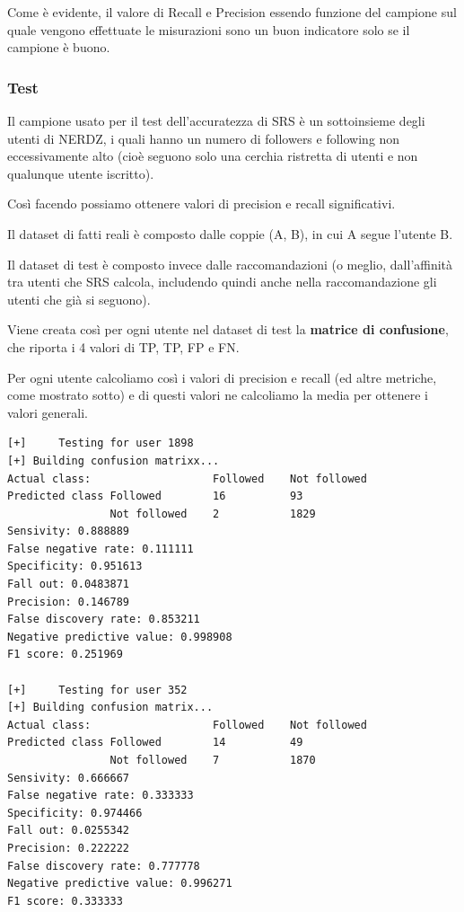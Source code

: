 {Come è evidente, il valore di Recall e Precision essendo funzione del campione sul quale vengono effettuate le misurazioni sono un buon indicatore solo se il campione è buono.

\subsubsection{Test}
Il campione usato per il test dell'accuratezza di SRS è un sottoinsieme degli utenti di NERDZ, i quali hanno un numero di followers e following non eccessivamente alto (cioè seguono solo una cerchia ristretta di utenti e non qualunque utente iscritto).

Così facendo possiamo ottenere valori di precision e recall significativi.

Il dataset di fatti reali è composto dalle coppie (A, B), in cui A segue l'utente B.

Il dataset di test è composto invece dalle raccomandazioni (o meglio, dall'affinità tra utenti che SRS calcola, includendo quindi anche nella raccomandazione gli utenti che già si seguono).

Viene creata così per ogni utente nel dataset di test la \textbf{matrice di confusione}, che riporta i 4 valori di TP, TP, FP e FN.

Per ogni utente calcoliamo così i valori di precision e recall (ed altre metriche, come mostrato sotto) e di questi valori ne calcoliamo la media per ottenere i valori generali.
\begin{lstlisting}[language=xml, caption=Alcuni risultati dai test sul dataset]
[+]     Testing for user 1898
[+] Building confusion matrixx...
Actual class:                   Followed    Not followed
Predicted class Followed        16          93
                Not followed    2           1829
Sensivity: 0.888889
False negative rate: 0.111111
Specificity: 0.951613
Fall out: 0.0483871
Precision: 0.146789
False discovery rate: 0.853211
Negative predictive value: 0.998908
F1 score: 0.251969

[+]     Testing for user 352
[+] Building confusion matrix...
Actual class:                   Followed    Not followed
Predicted class Followed        14          49
                Not followed    7           1870
Sensivity: 0.666667
False negative rate: 0.333333
Specificity: 0.974466
Fall out: 0.0255342
Precision: 0.222222
False discovery rate: 0.777778
Negative predictive value: 0.996271
F1 score: 0.333333
\end{lstlisting}

}
